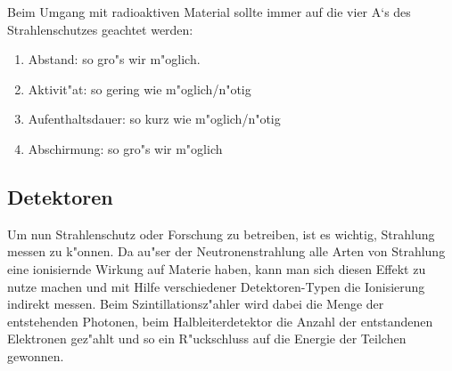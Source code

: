 \documentclass[12pt]{article}
\begin{document}
Beim Umgang mit radioaktiven Material sollte immer auf die vier A`s des Strahlenschutzes geachtet werden:
\begin{enumerate}
	\item Abstand: so gro"s wir m"oglich. 
	\item Aktivit"at: so gering wie m"oglich/n"otig
	\item Aufenthaltsdauer: so kurz wie m"oglich/n"otig
	\item Abschirmung: so gro"s wir m"oglich
\end{enumerate}
  
\subsection{Detektoren}

Um nun Strahlenschutz oder Forschung zu betreiben, ist es wichtig, Strahlung messen zu k"onnen. Da au"ser der Neutronenstrahlung alle Arten von Strahlung eine ionisiernde Wirkung auf Materie haben, kann man sich diesen Effekt zu nutze machen und mit Hilfe verschiedener Detektoren-Typen die Ionisierung indirekt messen. Beim Szintillationsz"ahler wird dabei die Menge der entstehenden Photonen, beim Halbleiterdetektor die Anzahl der entstandenen Elektronen gez"ahlt und so ein R"uckschluss auf die Energie der Teilchen gewonnen. 
\end{document}
